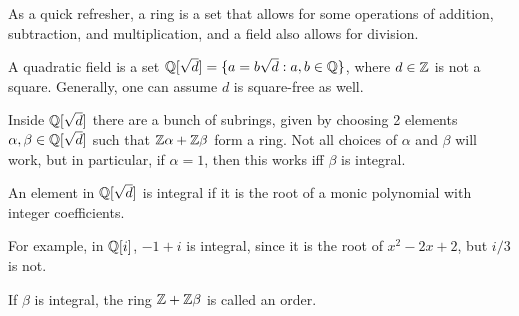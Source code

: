 As a quick refresher, a ring is a set that allows for some operations of addition, subtraction, and multiplication, and a field also allows for division.

\label{qfields}
\begin{defn}
A quadratic field is a set $\mathbb{Q}[\sqrt{d}] = \{a = b\sqrt{d}:a,b\in\mathbb{Q}\}$, where $d\in\mathbb{Z}$ is not a square. Generally, one can assume $d$ is square-free as well.
\end{defn}%

Inside $\mathbb{Q}[\sqrt{d}]$ there are a bunch of subrings, given by choosing 2 elements $\alpha,\beta\in\mathbb{Q}[\sqrt{d}]$ such that $\mathbb{Z}\alpha+\mathbb{Z}\beta$ form a ring. Not all choices of $\alpha$ and $\beta$ will work, but in particular, if $\alpha = 1$, then this works iff $\beta$ is integral.

\begin{defn}
An element in $\mathbb{Q}[\sqrt{d}]$ is integral if it is the root of a monic polynomial with integer coefficients.
\end{defn}
For example, in $\mathbb{Q}[i]$, $-1+i$ is integral, since it is the root of $x^2-2x+2$, but $i/3$ is not.
\begin{defn}
If $\beta$ is integral, the ring $\mathbb{Z}+\mathbb{Z}\beta$ is called an order.
\end{defn}

